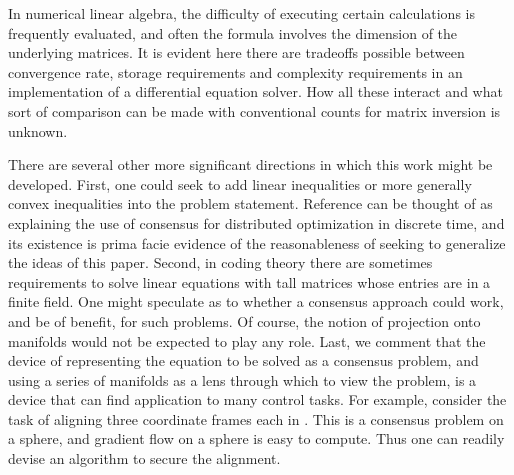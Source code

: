 \documentclass{aims}
\begin{document}
In numerical linear algebra, the difficulty of executing certain calculations is frequently evaluated, and often the formula involves the dimension of the underlying matrices. It is evident here there are tradeoffs possible between convergence rate, storage requirements and complexity requirements in an implementation of a differential equation solver. How all these interact and what sort of comparison can be made with conventional counts for matrix inversion is unknown.

There are several other more significant directions in which this work might be developed. First, one could seek to add linear inequalities or more generally convex inequalities into the problem statement. Reference \cite{AAP10TAC}  can be thought of as  explaining the use of consensus for distributed optimization in discrete time, and its existence is prima facie evidence of the reasonableness of seeking to generalize the ideas of this paper. Second,  in coding theory there are sometimes requirements to solve linear equations with tall matrices whose entries are in a finite field. One might speculate  as to whether a consensus approach could work, and be of benefit, for such problems. Of course, the notion of projection onto manifolds would not be expected to play any role.
Last, we comment that the device of representing the equation to be solved as a consensus problem, and using a series of manifolds as a lens through which to view the problem, is a device that can find application to many control tasks. For example, consider the task of aligning three coordinate frames each in . This is a consensus problem on a sphere, and gradient flow on a sphere is easy to compute. Thus one can readily devise an algorithm to secure the alignment.
\end{document}
